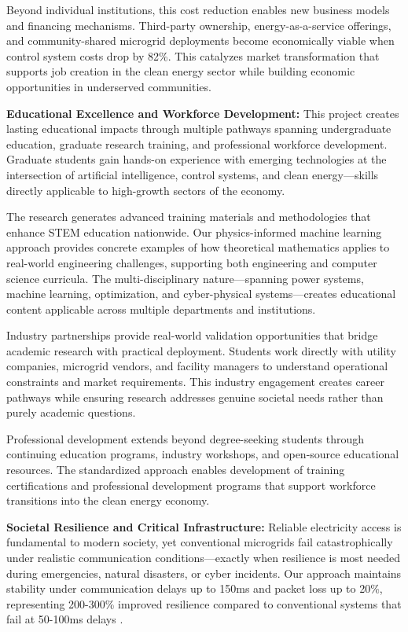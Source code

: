 \documentclass[12pt]{article}
\begin{document}
Beyond individual institutions, this cost reduction enables new business models and financing mechanisms. Third-party ownership, energy-as-a-service offerings, and community-shared microgrid deployments become economically viable when control system costs drop by 82\%. This catalyzes market transformation that supports job creation in the clean energy sector while building economic opportunities in underserved communities.

\textbf{Educational Excellence and Workforce Development:} This project creates lasting educational impacts through multiple pathways spanning undergraduate education, graduate research training, and professional workforce development. Graduate students gain hands-on experience with emerging technologies at the intersection of artificial intelligence, control systems, and clean energy—skills directly applicable to high-growth sectors of the economy.

The research generates advanced training materials and methodologies that enhance STEM education nationwide. Our physics-informed machine learning approach provides concrete examples of how theoretical mathematics applies to real-world engineering challenges, supporting both engineering and computer science curricula. The multi-disciplinary nature—spanning power systems, machine learning, optimization, and cyber-physical systems—creates educational content applicable across multiple departments and institutions.

Industry partnerships provide real-world validation opportunities that bridge academic research with practical deployment. Students work directly with utility companies, microgrid vendors, and facility managers to understand operational constraints and market requirements. This industry engagement creates career pathways while ensuring research addresses genuine societal needs rather than purely academic questions.

Professional development extends beyond degree-seeking students through continuing education programs, industry workshops, and open-source educational resources. The standardized approach enables development of training certifications and professional development programs that support workforce transitions into the clean energy economy.

\textbf{Societal Resilience and Critical Infrastructure:} Reliable electricity access is fundamental to modern society, yet conventional microgrids fail catastrophically under realistic communication conditions—exactly when resilience is most needed during emergencies, natural disasters, or cyber incidents. Our approach maintains stability under communication delays up to 150ms and packet loss up to 20\%, representing 200-300\% improved resilience compared to conventional systems that fail at 50-100ms delays \cite{baseline2023delay}.
\end{document}
